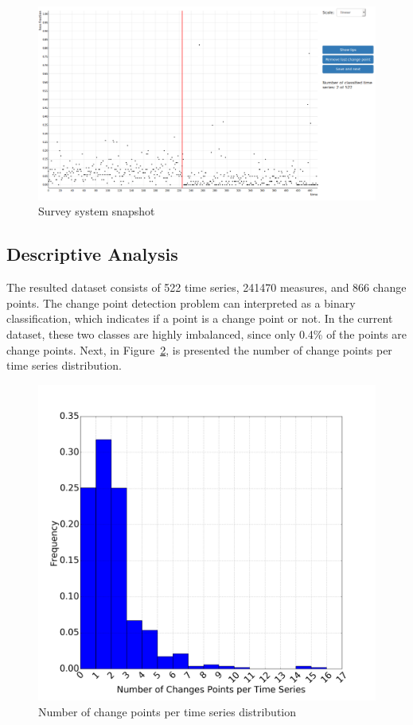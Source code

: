 \begin{figure}[H]
    \centering
    \includegraphics[width=\linewidth]{./figures/dataset/cp/survey_system.png}
    \caption{Survey system snapshot}
    \label{fig:survey_system}
\end{figure}%

\subsection{Descriptive Analysis}

The resulted dataset consists of 522 time series, 241470 measures, and 866 change points. The change point detection problem can interpreted as a binary classification, which indicates if a point is a change point or not. In the current dataset, these two classes are highly imbalanced, since only 0.4\% of the points are change points. Next, in Figure~\ref{fig:cps_per_ts}, is presented the number of change points per time series distribution.

\begin{figure}[H]
    \centering
    \includegraphics[width=0.6\linewidth]{./figures/dataset/cp/cps_per_ts.png}
    \caption{Number of change points per time series distribution}
    \label{fig:cps_per_ts}
\end{figure}%

